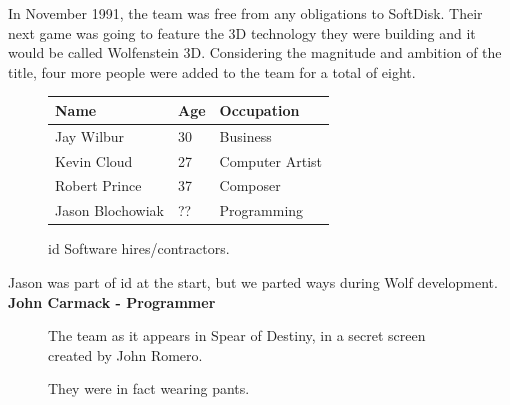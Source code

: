 \documentclass[book.tex]{subfiles}
\begin{document}
In November 1991, the team was free from any obligations to SoftDisk. Their next game was going to feature the 3D technology they were building and it would be called Wolfenstein 3D. Considering the magnitude and ambition of the title, four more people were added to the team for a total of eight.\\
 \begin{figure}[H]
\centering  
\begin{tabularx}{\textwidth}{ X  X  X  }
  \toprule
  \textbf{Name} &  \textbf{Age} & \textbf{Occupation} \\
  \toprule 
   Jay Wilbur & 30 &  Business\\
   Kevin Cloud\protect\footnotemark & 27 &  Computer Artist\\
   Robert Prince\protect\footnotemark & 37 &  Composer\\
   Jason Blochowiak\protect\footnotemark & ?? &   Programming\\
     \toprule
\end{tabularx}
\caption{id Software hires/contractors.}\label{fig:Id Software hires}
\end{figure}
\addtocounter{footnote}{-2}

\begin{fancyquotes}
Jason was part of id at the start, but we parted ways during Wolf development.
 \bigskip \\
\textbf{John Carmack - Programmer}
 \end{fancyquotes}


 
\begin{figure}[H]
\centering
\caption{The team as it appears in Spear of Destiny, in a secret screen created by John Romero.}
\label{fig:id_team_1993}
\end{figure}
 
\begin{figure}[H]
\centering
\caption{They were in fact wearing pants.}
\label{fig:id_team_1993}
\end{figure}
\end{document}
